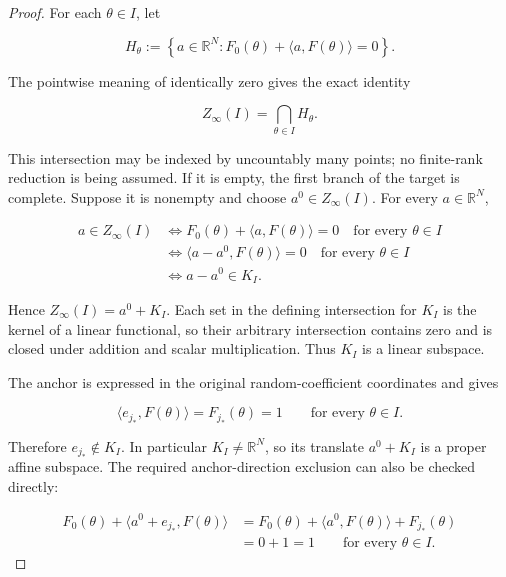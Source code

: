 \begin{proof}
For each \(\theta\in I\), let

\begin{equation}
\label{eq:appendix-display-035}
H_\theta
:=\left\{a\in\mathbb R^N:
F_0(\theta)+\langle a,F(\theta)\rangle=0\right\}.
\end{equation}

The pointwise meaning of identically zero gives the exact identity

\begin{equation}
\label{eq:appendix-display-036}
Z_\infty(I)=\bigcap_{\theta\in I}H_\theta.
\end{equation}

This intersection may be indexed by uncountably many points; no finite-rank reduction is being assumed. If it
is empty, the first branch of the target is complete. Suppose it is nonempty and choose
\(a^0\in Z_\infty(I)\). For every \(a\in\mathbb R^N\),

\begin{equation}
\label{eq:appendix-display-037}
\begin{aligned}
a\in Z_\infty(I)
&\Longleftrightarrow
F_0(\theta)+\langle a,F(\theta)\rangle=0
\quad\text{for every }\theta\in I\\
&\Longleftrightarrow
\langle a-a^0,F(\theta)\rangle=0
\quad\text{for every }\theta\in I\\
&\Longleftrightarrow a-a^0\in K_I.
\end{aligned}
\end{equation}

Hence \(Z_\infty(I)=a^0+K_I\). Each set in the defining intersection for \(K_I\) is the kernel of a linear
functional, so their arbitrary intersection contains zero and is closed under addition and scalar
multiplication. Thus \(K_I\) is a linear subspace.

The anchor is expressed in the original random-coefficient coordinates and gives

\begin{equation}
\label{eq:appendix-display-038}
\langle e_{j_*},F(\theta)\rangle
=F_{j_*}(\theta)
=1
\qquad\text{for every }\theta\in I.
\end{equation}

Therefore \(e_{j_*}\notin K_I\). In particular \(K_I\neq\mathbb R^N\), so its translate
\(a^0+K_I\) is a proper affine subspace. The required anchor-direction exclusion can also be checked directly:

\begin{equation}
\label{eq:appendix-display-039}
\begin{aligned}
F_0(\theta)+\langle a^0+e_{j_*},F(\theta)\rangle
&=
F_0(\theta)+\langle a^0,F(\theta)\rangle+F_{j_*}(\theta)\\
&=0+1=1
\qquad\text{for every }\theta\in I.
\end{aligned}
\end{equation}


\end{proof}
